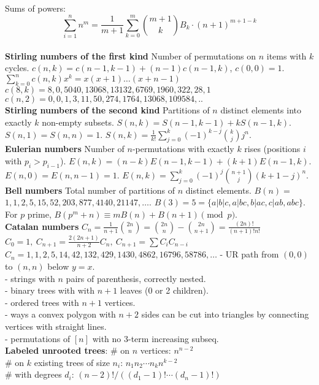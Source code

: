 Sums of powers: {\footnotesize \[ \sum_{i=1}^n n^m = \frac{1}{m+1} \sum_{k=0}^m \binom{m+1}{k} B_k \cdot (n+1)^{m+1-k} \] }\\
\textbf{Stirling numbers of the first kind} Number of permutations on $n$ items with $k$ cycles. $c(n,k) = c(n-1,k-1) + (n-1) c(n-1,k)$, $c(0,0) = 1$.$\sum_{k=0}^n c(n,k)x^k =$$x(x+1) \dots (x+n-1)$
{\footnotesize
$c(8,k) = 8, 0, 5040, 13068, 13132, 6769, 1960, 322, 28, 1$ \\
$c(n,2) = 0, 0, 1, 3, 11, 50, 274, 1764, 13068, 109584, ..$
}\\
\textbf{Stirling numbers of the second kind} Partitions of $n$ distinct elements into exactly $k$ non-empty subsets. $S(n,k) = S(n-1,k-1) + k S(n-1,k)$. $S(n,1) = S(n,n) = 1$. $S(n,k) = \frac{1}{k!}\sum_{j=0}^k (-1)^{k-j}\binom{k}{j}j^n$.\\
\textbf{Eulerian numbers} Number of $n$-permutations with exactly $k$ rises (positions $i$ with $p_i > p_{i-1}$). $E(n,k) = (n-k)E(n-1,k-1) + (k+1)E(n-1,k)$. $E(n,0) = E(n,n-1) = 1$. $E(n,k) = \sum_{j=0}^k(-1)^j\binom{n+1}{j}(k+1-j)^n$.\\
\textbf{Bell numbers} Total number of partitions of $n$ distinct elements. $B(n) =$ $1, 1, 2, 5, 15, 52, 203, 877, 4140, 21147, \dots$. $B(3) = 5 = \{a|b|c, a|bc, b|ac, c|ab, abc\}$. For $p$ prime, $B(p^m+n)\equiv mB(n)+B(n+1) \pmod{p}$.\\
\textbf{Catalan numbers}
$C_n=\frac{1}{n+1}\binom{2n}{n}= \binom{2n}{n}-\binom{2n}{n+1} = \frac{(2n)!}{(n+1)!n!}$\\
$C_0=1,\ C_{n+1} = \frac{2(2n+1)}{n+2}C_n,\ C_{n+1}=\sum C_iC_{n-i}$
${C_n = 1, 1, 2, 5, 14, 42, 132, 429, 1430, 4862, 16796, 58786, \dots}$
- UR path from $(0,0)$ to $(n,n)$ below $y=x$.\\
- strings with $n$ pairs of parenthesis, correctly nested.\\
- binary trees with with $n+1$ leaves (0 or 2 children).\\
- ordered trees with $n+1$ vertices.\\
- ways a convex polygon with $n+2$ sides can be cut into triangles by connecting vertices with straight lines.\\
- permutations of $[n]$ with no 3-term increasing subseq.\\
\textbf{Labeled unrooted trees}:
\# on $n$ vertices: $n^{n-2}$ \\
\# on $k$ existing trees of size $n_i$: $n_1n_2\cdots n_k n^{k-2}$ \\
\# with degrees $d_i$: $(n-2)! / ((d_1-1)! \cdots (d_n-1)!)$\\
$$
